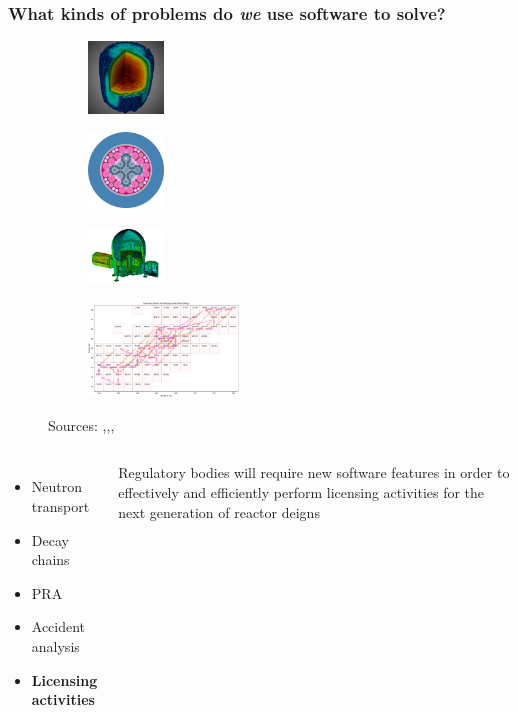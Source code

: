 \begin{frame}
    \frametitle{What kinds of problems do {\it we} use software to solve?}

    \begin{figure}[htpb]
        \begin{subfigure}
            \centering
            \includegraphics[width=2cm]{images/exasmr.png}
        \end{subfigure}
        \begin{subfigure}
           \centering
           \includegraphics[width=2cm]{images/atr.png} 
        \end{subfigure}
        \begin{subfigure}
           \centering
           \includegraphics[width=2cm]{images/hab1.png} 
        \end{subfigure}
        \begin{subfigure}
            \centering
            \includegraphics[width=4cm]{images/transmutation.png}
        \end{subfigure}
        {\tiny Sources: \cite{exasmr_fig},\cite{openmc_atr_slice},\cite{dagmc_nasa_module},\cite{armi_transmutation_fig}}
    \end{figure}
    \pause\medskip
    \begin{columns}
        \column[t]{5cm}
        \begin{itemize}
            \item Neutron transport
            \item Decay chains
            \item PRA
            \item Accident analysis
            \item {\bf Licensing activities}
        \end{itemize}

        \column[t]{5cm}
        Regulatory bodies will require new software features in order to effectively and efficiently perform licensing activities for the next generation of reactor deigns\cite{usnrc_nonlwr_2020-1}
    \end{columns}

\end{frame}

